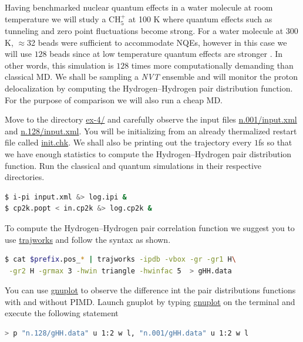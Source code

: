 \documentclass{article}
\begin{document}
\begin{Exercise}[label={ch5},title={PIMD in the strong quantum regime:  gas phase Methanium}]
\noindent Having benchmarked nuclear quantum effects in a water molecule at room temperature 
we will study a $\text{CH}_{5}^{+}$ at 100 K where quantum effects such as tunneling and 
zero point fluctuations become strong. For a water molecule at $300$K, $\approx$32 beads were 
sufficient to accommodate NQEs, however in this case we will use $128$ beads since at low 
temperature quantum effects are stronger . In other words, this simulation is $128$ times more computationally 
demanding than classical MD. We shall be sampling a \emph{NVT} ensemble and will monitor the 
proton delocalization by computing the Hydrogen--Hydrogen pair distribution function. For the 
purpose of comparison we will also run a cheap MD.

\Question
Move to the directory \url{ex-4/} and carefully observe the \ipi{} input files \url{n.001/input.xml} 
and \url{n.128/input.xml}. You will be initializing from an already thermalized restart file called 
\url{init.chk}. We shall also be printing out the trajectory every $1$fs so that we have enough 
statistics to compute the Hydrogen--Hydrogen pair distribution function. Run the classical and 
quantum simulations in their respective directories.

\begin{lstlisting}[language=bash]
$ i-pi input.xml &> log.ipi &
$ cp2k.popt < in.cp2k &> log.cp2k &
\end{lstlisting}

\Question
To compute the Hydrogen--Hydrogen pair correlation function we suggest you to use \url{trajworks} and follow the syntax as shown. 
\begin{lstlisting}[language=bash]
$ cat $prefix.pos_* | trajworks -ipdb -vbox -gr -gr1 H\
 -gr2 H -grmax 3 -hwin triangle -hwinfac 5  > gHH.data 
\end{lstlisting}

\Question
You can use \url{gnuplot} to observe the difference int the pair distributions functions with and without PIMD. 
Launch gnuplot by typing \url{gnuplot} on the terminal and execute the following statement 
\begin{lstlisting}[language=bash]
> p "n.128/gHH.data" u 1:2 w l, "n.001/gHH.data" u 1:2 w l
\end{lstlisting}

\end{Exercise}



\end{document}
